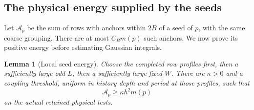 \documentclass[11pt,reqno]{amsart}
\numberwithin{equation}{section}
\newtheorem{lemma}[theorem]{Lemma}
\theoremstyle{definition}
\theoremstyle{remark}
\begin{document}
\subsection{The physical energy supplied by the seeds}

Let \(\mathcal A_p\) be the sum of rows with anchors within
\(2B\) of a seed of \(p\), with the same coarse grouping.
There are at most \(C_Bm(p)\) such anchors. We now prove its
positive energy before estimating Gaussian integrals.

\begin{lemma}[Local seed energy]
\label{lem:packet-seed-energy}
Choose the completed row profiles first, then a sufficiently
large odd \(L\), then a sufficiently large fixed \(W\).
There are \(\kappa>0\) and a coupling threshold, uniform in
history depth and period at those profiles, such that
\begin{equation}
                              \mathcal A_p\ge\kappa h^2m(p)
 \label{eq:packet-positive-seed-energy}
\end{equation}
on the actual retained physical tests.
\end{lemma}
\end{document}
